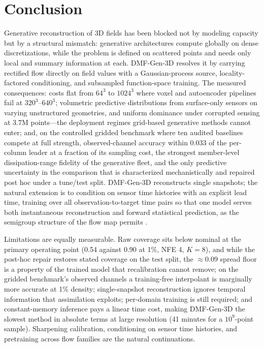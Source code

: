 \documentclass{article} %
\newcommand{\model}{DMF-Gen-3D}
\begin{document}
\section{Conclusion}
\label{sec:conclusion}

Generative reconstruction of 3D fields has been blocked not by modeling capacity but by a structural mismatch: generative architectures compute globally on dense discretizations, while the problem is defined on scattered points and needs only local and summary information at each. \model{} resolves it by carrying rectified flow directly on field values with a Gaussian-process source, locality-factored conditioning, and subsampled function-space training. The measured consequences: costs flat from $64^3$ to $1024^3$ where voxel and autoencoder pipelines fail at $320^3$--$640^3$; volumetric predictive distributions from surface-only sensors on varying unstructured geometries, and uniform dominance under corrupted sensing at $3.7$M points---the deployment regimes grid-based generative methods cannot enter; and, on the controlled gridded benchmark where ten audited baselines compete at full strength, observed-channel accuracy within 0.033 of the per-column leader at a fraction of its sampling cost, the strongest member-level dissipation-range fidelity of the generative fleet, and the only predictive uncertainty in the comparison that is characterized mechanistically and repaired post hoc under a tune/test split. \model{} reconstructs single snapshots; the natural extension is to condition on sensor time histories with an explicit lead time, training over all observation-to-target time pairs so that one model serves both instantaneous reconstruction and forward statistical prediction, as the semigroup structure of the flow map permits \citep{raonic2026gencfd}.

Limitations are equally measurable. Raw coverage sits below nominal at the primary operating point (0.54 against 0.90 at 1\%, NFE 4, $K{=}8$), and while the post-hoc repair restores stated coverage on the test split, the ${\approx}0.09$ spread floor is a property of the trained model that recalibration cannot remove; on the gridded benchmark's observed channels a training-free interpolant is marginally more accurate at 1\% density; single-snapshot reconstruction ignores temporal information that assimilation exploits; per-domain training is still required; and constant-memory inference pays a linear time cost, making \model{} the slowest method in absolute terms at large resolution (41 minutes for a $10^9$-point sample). Sharpening calibration, conditioning on sensor time histories, and pretraining across flow families are the natural continuations.
\end{document}

